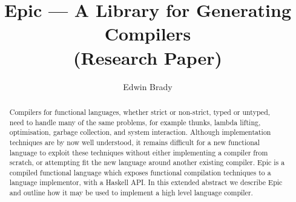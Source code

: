 \documentclass[orivec,dvips,10pt]{llncs}
\newcounter{per}
\begin{document}
\title{Epic --- A Library for Generating Compilers\\(Research Paper)}
\author{Edwin Brady}


\maketitle

\begin{abstract}
Compilers for functional languages, whether strict or non-strict,
typed or untyped, need to handle many of the same problems, for
example thunks, lambda lifting, optimisation, garbage collection, and
system interaction.  Although implementation techniques are by now
well understood, it remains difficult for a new functional language to
exploit these techniques without either implementing a compiler from
scratch, or attempting fit the new language around another existing
compiler.
Epic is a compiled functional language which exposes functional
compilation techniques to a language implementor, with a Haskell
API. In this extended abstract we describe Epic and outline how it may
be used to implement a high level language compiler.

\end{abstract}







%

%






\begin{small}


\appendix

%

\end{small}
\end{document}
